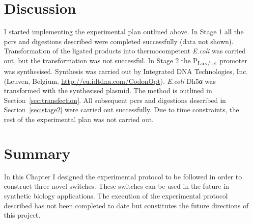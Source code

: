 
\clearpage
\section{Discussion}

I started implementing the experimental plan outlined above. In Stage 1 all the \acrshort{pcr}s and digestions described were completed successfully (data not shown). Transformation of the ligated products into thermocompetent \textit{E.coli} was carried out, but the transformation was not successful. In Stage 2 the P\textsubscript{Lux/tet} promoter was synthesised. Synthesis was carried out by Integrated DNA Technologies, Inc. (Leuven, Belgium, \url{http://eu.idtdna.com/CodonOpt}). \textit{E.coli} Dh5α was transformed with the synthesised plasmid. The method is outlined in Section~\ref{sec:transfection}. All subsequent \acrshort{pcr}s and digestions described in Section~\ref{sec:stage2} were carried out successfully. Due to time constraints, the rest of the experimental plan was not carried out.



\section{Summary}

In this Chapter I designed the experimental protocol to be followed in order to construct three novel switches. These switches can be used in the future in synthetic biology applications. The execution of the experimental protocol described has not been completed to date but constitutes the future directions of this project.


